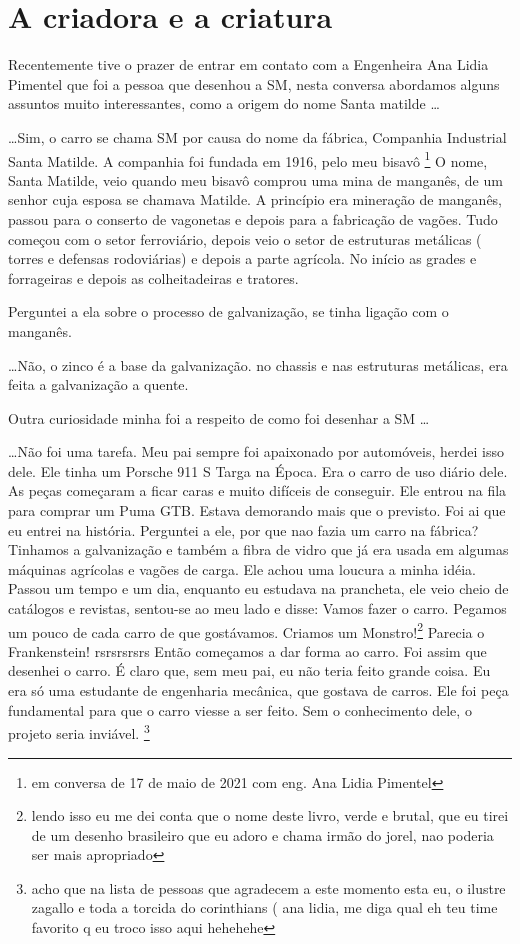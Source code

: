 \documentclass[a4paper]{report}
\begin{document}
\section*{A criadora e a criatura}

Recentemente tive o prazer de entrar em contato com a Engenheira Ana Lidia Pimentel que foi a pessoa que desenhou a SM, nesta conversa abordamos alguns
assuntos muito interessantes, como a origem do nome Santa matilde \dots

\dots Sim, o carro se chama SM por causa do nome da f\'abrica, Companhia Industrial Santa Matilde. A companhia foi fundada em 1916, pelo meu bisav\^o \footnote{ em conversa de 17 de maio de 2021 com eng. Ana Lidia Pimentel }
O nome, Santa Matilde, veio quando meu bisav\^o comprou uma mina de mangan\^es, de um senhor cuja esposa se chamava Matilde.
A princ\'ipio era minera\c{c}\~ao de mangan\^es, passou para o conserto de vagonetas e depois para a fabrica\c{c}\~ao de vag\~oes.
Tudo come\c{c}ou com o setor ferrovi\'ario, depois veio o setor de estruturas met\'alicas ( torres e defensas rodovi\'arias) e depois a parte agr\'icola. No in\'icio as grades e forrageiras e depois as colheitadeiras e tratores. 

Perguntei a ela sobre o processo de galvaniza\c{c}\~ao, se tinha liga\c{c}\~ao com o mangan\^es. 

\dots N\~ao, o zinco \'e a base da galvaniza\c{c}\~ao. no chassis e nas estruturas met\'alicas, era feita a galvaniza\c{c}\~ao a quente.

Outra curiosidade minha foi a respeito de como foi desenhar a SM \dots

\dots N\~ao foi uma tarefa. Meu pai sempre foi apaixonado por autom\'oveis, herdei isso dele. Ele tinha um Porsche 911 S Targa na \'Epoca. Era o carro de uso di\'ario dele. As pe\c{c}as come\c{c}aram a ficar caras e muito dif\'iceis de conseguir. Ele entrou na fila para comprar um Puma GTB. Estava demorando mais que o previsto. Foi ai que eu entrei na hist\'oria. Perguntei a ele, por que nao fazia um carro na f\'abrica? 
Tinhamos a galvaniza\c{c}\~ao e tamb\'em a fibra de vidro que j\'a era usada em algumas m\'aquinas agr\'icolas e vag\~oes de carga. Ele achou uma loucura a minha id\'eia.
Passou um tempo e um dia, enquanto eu estudava na prancheta, ele veio cheio de cat\'alogos e revistas, sentou-se ao meu lado e disse: Vamos fazer o carro.
Pegamos um pouco de cada carro de que gost\'avamos. Criamos um Monstro!\footnote{lendo isso eu me dei conta que o nome deste livro, verde e brutal, que eu tirei de um desenho brasileiro que eu adoro e chama irm\~ao do jorel, nao poderia ser mais apropriado} 
Parecia o Frankenstein! rsrsrsrsrs
Ent\~ao come\c{c}amos a dar forma ao carro.
Foi assim que desenhei o carro. \'E claro que, sem meu pai, eu n\~ao teria feito grande coisa. Eu era s\'o uma estudante de engenharia mec\^anica, que gostava de carros. Ele foi pe\c{c}a fundamental para que o carro viesse a ser feito. Sem o conhecimento dele, o projeto seria invi\'avel. \footnote{acho que na lista de pessoas que agradecem a este momento esta eu, o ilustre zagallo e toda a torcida do corinthians ( ana lidia, me diga qual eh teu time favorito q eu troco isso aqui hehehehe }


\clearpage

\printindex
 
\end{document}
